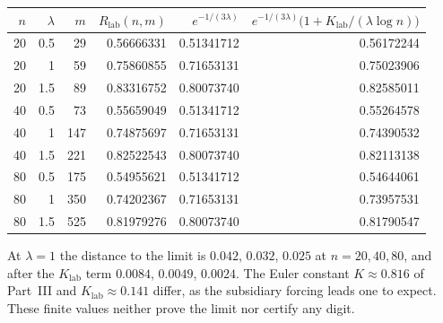 \documentclass[11pt,letterpaper]{article}
\theoremstyle{remark}\newtheorem{remark}[theorem]{Remark}
\begin{document}
\begin{center}
\small
\begin{tabular}{rrrrrr}
\toprule
$n$ & $\lambda$ & $m$ & $R_{\mathrm{lab}}(n,m)$ & $e^{-1/(3\lambda)}$ & $e^{-1/(3\lambda)}\bigl(1+K_{\mathrm{lab}}/(\lambda\log n)\bigr)$\\
\midrule
20 & 0.5 & 29 & 0.56666331 & 0.51341712 & 0.56172244\\
20 & 1 & 59 & 0.75860855 & 0.71653131 & 0.75023906\\
20 & 1.5 & 89 & 0.83316752 & 0.80073740 & 0.82585011\\
40 & 0.5 & 73 & 0.55659049 & 0.51341712 & 0.55264578\\
40 & 1 & 147 & 0.74875697 & 0.71653131 & 0.74390532\\
40 & 1.5 & 221 & 0.82522543 & 0.80073740 & 0.82113138\\
80 & 0.5 & 175 & 0.54955621 & 0.51341712 & 0.54644061\\
80 & 1 & 350 & 0.74202367 & 0.71653131 & 0.73957531\\
80 & 1.5 & 525 & 0.81979276 & 0.80073740 & 0.81790547\\
\bottomrule
\end{tabular}
\end{center}
At $\lambda=1$ the distance to the limit is $0.042$, $0.032$, $0.025$ at $n=20,40,80$, and after the $K_{\mathrm{lab}}$ term $0.0084$, $0.0049$, $0.0024$. The Euler constant $K\approx0.816$ of Part~III and $K_{\mathrm{lab}}\approx0.141$ differ, as the subsidiary forcing leads one to expect. These finite values neither prove the limit nor certify any digit.
\end{document}
